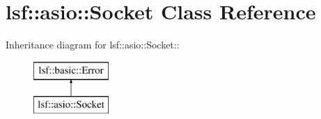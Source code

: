 \hypertarget{classlsf_1_1asio_1_1Socket}{
\section{lsf::asio::Socket Class Reference}
\label{classlsf_1_1asio_1_1Socket}
}
Inheritance diagram for lsf::asio::Socket::\begin{figure}[H]
\begin{center}
\leavevmode
\includegraphics[height=2cm]{classlsf_1_1asio_1_1Socket}
\end{center}
\end{figure}
